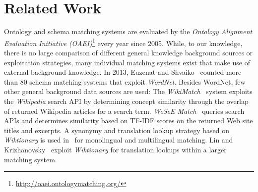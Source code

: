 \documentclass[runningheads]{llncs}
\begin{document}
\section{Related Work}
Ontology and schema matching systems are evaluated by the \textit{Ontology Alignment Evaluation Initiative (OAEI)}\footnote{\url{http://oaei.ontologymatching.org/}} every year since 2005.
While, to our knowledge, there is no large comparison of different general knowledge background sources or exploitation strategies, many individual matching systems exist that make use of external background knowledge.
In 2013, Euzenat and Shvaiko~\cite{euzenat_ontology_2013} counted more than 80 schema matching systems that exploit \textit{WordNet}. Besides WordNet, few other general background data sources are used: 
The \textit{WikiMatch}~\cite{shvaiko_wikimatch_2012} system exploits the \textit{Wikipedia} search API by determining concept similarity through the overlap of returned Wikipedia articles for a search term. \textit{WeSeE Match}~\cite{wesee_match_1} queries search APIs and determines similarity based on TF-IDF scores on the returned Web site titles and excerpts.
A synonymy and translation lookup strategy based on \textit{Wiktionary} is used in~\cite{DBLP:conf/semweb/PortischP20} for monolingual and multilingual matching. Lin and Krizhanovsky~\cite{lin_krizhanovsky} exploit \textit{Wiktionary} for translation lookups within a larger matching system.
\end{document}

